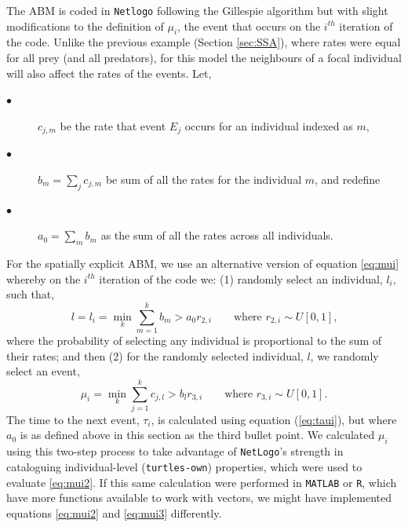 \documentclass[11pt, oneside]{article}   	%
\begin{document}
The ABM is coded in \texttt{Netlogo} following the Gillespie algorithm but with slight modifications to the definition of $\mu_i$, the event that occurs on the $i^{th}$ iteration of the code. Unlike the previous example (Section \ref{sec:SSA}), where rates were equal for all prey (and all predators), for this model the neighbours of a focal individual will also affect the rates of the events. Let,

\begin{description} 
\item[$\bullet$] $c_{j,m}$ be the rate that event $E_j$ occurs for an individual indexed as $m$, 
\item[$\bullet$] $b_m = \sum_j c_{j,m}$ be sum of all the rates for the individual $m$, and redefine
\item[$\bullet$] $a_0 = \sum_m b_m$ as the sum of all the rates across all individuals.
\end{description}

For the spatially explicit ABM, we use an alternative version of equation \ref{eq:mui} whereby on the $i^{th}$ iteration of the code we: (1) randomly select an individual, $l_i$, such that,
%
\begin{equation}\label{eq:mui2}
l=l_i = \min_k\sum_{m=1}^{k} b_{m}> a_0 r_{2,i} \qquad \mbox{where $r_{2,i} \sim U[0,1]$,}
\end{equation}
%
where the probability of selecting any individual is proportional to the sum of their rates; and then (2) for the randomly selected individual, $l$, we randomly select an event,
%
\begin{equation}\label{eq:mui3}
\mu_i = \min_k\sum_{j=1}^{k} c_{j,l}> b_l r_{3,i} \qquad \mbox{where $r_{3,i} \sim U[0,1]$.}
\end{equation}
%
The time to the next event, $\tau_i$, is calculated using equation (\ref{eq:taui}), but where $a_0$ is as defined above in this section as the third bullet point. We calculated $\mu_i$ using this two-step process to take advantage of \texttt{NetLogo}'s strength in cataloguing individual-level (\texttt{turtles-own}) properties, which were used to evaluate \ref{eq:mui2}. If this same calculation were performed in \texttt{MATLAB} or \texttt{R}, which have more functions available to work with vectors, we might have implemented equations \ref{eq:mui2} and \ref{eq:mui3} differently.
\end{document}
